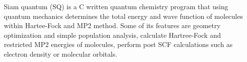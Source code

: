 Siam quantum (SQ) is a C written quantum chemistry program that using quantum mechanics determines the total energy and wave function of molecules within Hartee-Fock and MP2 method. Some of its features are geometry optimization and simple population analysis, calculate Hartree-Fock and restricted MP2 energies of molecules, perform post SCF calculations such as electron density or molecular orbitals.